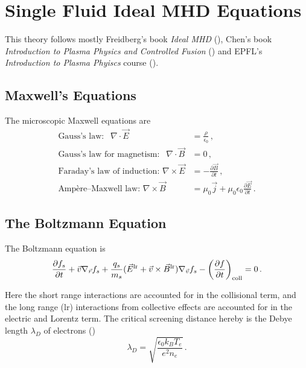 \chapter{Single Fluid Ideal MHD Equations}
\label{chap: Single Fluid Ideal MHD Equations}

This theory follows mostly Freidberg's book \emph{Ideal MHD} 
(\cite{Freidberg2014}), Chen's book \emph{Introduction to Plasma Physics and Controlled Fusion} (\cite{Chen2016}) 
and EPFL's \emph{Introduction to Plasma Phyiscs} course (\cite{epfl_plasma_intro}).

\section{Maxwell's Equations}
The microscopic Maxwell equations are
\begin{align}
    \text{Gauss's law: }\;\, \nabla \cdot \vec{E} &= \frac{\rho}{\epsilon_0}\, , \label{eq:gauss_e} \\
    \text{Gauss's law for magnetism: }\;\, \nabla \cdot \vec{B} &= 0 \, , \label{eq:gauss_b} \\
    \text{Faraday's law of induction: } \nabla \times \vec{E} &= -\frac{\partial \vec{B}}{\partial t} \, , \label{eq:faraday} \\
    \text{Ampère–Maxwell law: }  \nabla \times \vec{B} &= \mu_0 \vec{j} + \mu_0 \epsilon_0 \frac{\partial \vec{E}}{\partial t} \, . \label{eq:ampere}
\end{align}

\section{The Boltzmann Equation}
The Boltzmann equation is
\begin{equation*}
    \frac{\partial f_s}{\partial t} + \vec{v} \nabla_{\vec{r}} f_s + \frac{q_s}{m_s}(\vec{E}^{\operatorname{\operatorname{lr}}} + \vec{v}\times \vec{B}^{\operatorname{\operatorname{lr}}} ) \nabla_{\vec{v}} f_s - \left(\frac{\partial f}{\partial t}\right)_{\operatorname{coll}} = 0 \, .
\end{equation*}

Here the short range interactions are accounted for in the collisional term, and the long range (lr) interactions from collective effects are accounted for in the electric and Lorentz term.
The critical screening distance hereby is the Debye length $\lambda_{D}$ of electrons (\cite{Chen2016})
\begin{equation}
    \lambda_{D} = \sqrt{\frac{\epsilon_0 k_B T_e}{e^2 n_e}}  \, .
    \label{eq: debye length}
\end{equation}

